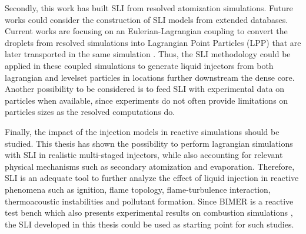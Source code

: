 Secondly, this work has built SLI from resolved atomization simulations. Future works could consider the construction of SLI models from extended databases. Current works are focusing on an Eulerian-Lagrangian coupling to convert the droplets from resolved simulations into Lagrangian Point Particles (LPP) that are later transported in the same simulation . Thus, the SLI methodology could be applied in these coupled simulations to generate liquid injectors from both lagrangian and levelset particles in locations further downstream the dense core. Another possibility to be considered is to feed SLI with experimental data on particles when available, since experiments do not often provide limitations on particles sizes as the resolved computations do.

Finally, the impact of the injection models in reactive simulations should be studied. This thesis has shown the possibility to perform lagrangian simulations with SLI in realistic multi-staged injectors, while also accounting for relevant physical mechanisms such as secondary atomization and evaporation. Therefore, SLI is an adequate tool to further analyze the effect of liquid injection in reactive phenomena such as ignition, flame topology, flame-turbulence interaction, thermoacoustic instabilities and pollutant formation. Since BIMER is a reactive test bench which also presents experimental results on combustion simulations , the SLI developed in this thesis could be used as starting point for such studies.

	

	
	
	
	
	
	
	
	
	





